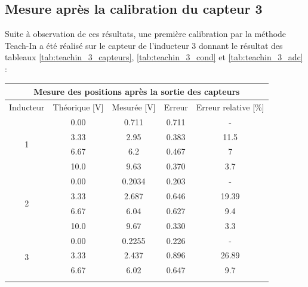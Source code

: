 \subsection{Mesure après la calibration du capteur 3}
Suite à observation de ces résultats, une première calibration par la méthode Teach-In a été réalisé sur le capteur de l'inducteur 3 donnant le résultat des tableaux \ref{tab:teachin_3_capteurs}, \ref{tab:teachin_3_cond} et \ref{tab:teachin_3_adc} :

\begin{table}[H]
    \centering
    \begin{tabular}{|c|c|c|c|c|}
        \hline
        \multicolumn{5}{|c|}{\textbf{Mesure des positions après la sortie des capteurs}}             \\ \hline
        Inducteur          & Théorique {[}V{]} & Mesurée {[}V{]} & Erreur & Erreur relative {[}\%{]} \\ \hline
        \multirow{4}{*}{1} & 0.00              & 0.711           & 0.711  & -                        \\ \cline{2-5}
                           & 3.33              & 2.95            & 0.383  & 11.5                     \\ \cline{2-5}
                           & 6.67              & 6.2             & 0.467  & 7                        \\ \cline{2-5}
                           & 10.0              & 9.63            & 0.370  & 3.7                      \\ \hline
        \multirow{4}{*}{2} & 0.00              & 0.2034          & 0.203  & -                        \\ \cline{2-5}
                           & 3.33              & 2.687           & 0.646  & 19.39                    \\ \cline{2-5}
                           & 6.67              & 6.04            & 0.627  & 9.4                      \\ \cline{2-5}
                           & 10.0              & 9.67            & 0.330  & 3.3                      \\ \hline
        \multirow{4}{*}{3} & 0.00              & 0.2255          & 0.226  & -                        \\ \cline{2-5}
                           & 3.33              & 2.437           & 0.896  & 26.89                    \\ \cline{2-5}
                           & 6.67              & 6.02            & 0.647  & 9.7                      \\ \cline{2-5}

\end{tabular}
\end{table}
